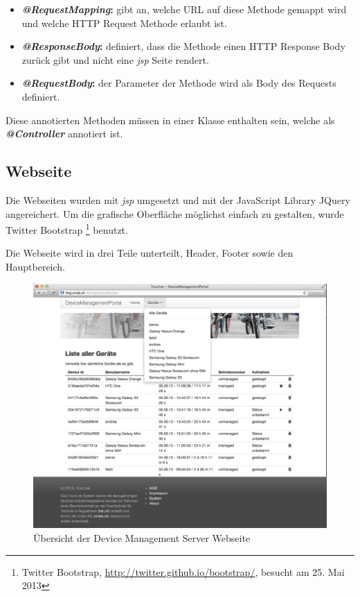 \begin{itemize}
\item \textbf{\textit{@RequestMapping}:} gibt an, welche URL auf diese Methode gemappt wird und welche HTTP Request Methode erlaubt ist.
\item\textbf{\textit{@ResponseBody}: } definiert, dass die Methode einen HTTP Response Body zurück gibt und nicht eine \textit{\gls{jsp}} Seite rendert.
\item\textbf{\textit{@RequestBody}: } der Parameter der Methode wird als Body des Requests definiert.
\end{itemize}
Diese annotierten Methoden müssen in einer Klasse enthalten sein, welche als \textit{\textbf{@Controller}} annotiert ist.


\subsection{Webseite}
Die Webseiten wurden mit \textit{\gls{jsp}} umgesetzt und mit der JavaScript Library JQuery angereichert. Um die grafische Oberfläche möglichst einfach zu gestalten, wurde  Twitter Bootstrap \footnote{Twitter Bootstrap, \url{http://twitter.github.io/bootstrap/}, besucht am 25. Mai 2013} benutzt.

Die Webseite wird in drei Teile unterteilt, Header, Footer sowie den Hauptbereich. 

\begin{figure}[H]
	\centering
	\includegraphics[width=120mm]{images/devmgmtsrv/all.png}
	\caption{Übersicht der Device Management Server Webseite}
\end{figure}

